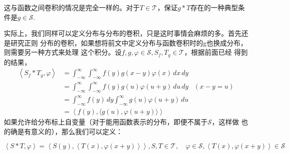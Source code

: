 这与函数之间卷积的情况是完全一样的。对于$T\in\mathcal{T}$，保证$g*T$存在的一种典型条件是$g\in\mathcal{S}$.

实际上，我们同样可以定义分布与分布的卷积，只是这时事情会麻烦的多。首先还是研究正则
分布的卷积，如果想将前文中定义分布与函数卷积时的g也换成分布，则需要另一种方式来处理
这个积分。设$f,g,\varphi\in\mathcal{S} ,S_f,T_g\in\mathcal{T} $，根据前面已经
得到的结果，
\begin{align*}
    \left\langle S_f *T_g,\varphi\right\rangle & =\int_{-\infty}^{\infty}\int_{-\infty}^{\infty}f(y)g(x-y)\varphi(x)\,dx\,dy           \\
                                    & =\int_{-\infty}^{\infty}\int_{-\infty}^{\infty}f(y)g(u)\varphi(u+y)\,du\,dy & (x-y=u) \\
                                    & =\int_{-\infty}^{\infty}f(y)\,dy\int_{-\infty}^{\infty}g(u)\varphi(u+y)\,du           \\
                                    & =\left\langle f(y),\langle g(u),\varphi(u+y)\rangle\right\rangle
\end{align*}
如果允许给分布标上自变量（对于能用函数表示的分布，即便不属于$\mathcal{S} $，这样做
也的确是有意义的），那么我们可以定义\cite{brad_osgood_ee261}：
\begin{definition}[分布与分布的卷积]\label{def:conv_distr_distr}
    \begin{equation*}
    \left\langle S*T,\varphi\right\rangle=\left\langle S(y),\left\langle T(x),\varphi(x+y)\right\rangle\right\rangle,S,T\in\mathcal{T} ,\quad\varphi\in\mathcal{S} ,\left\langle T(x),\varphi(x+y)\right\rangle\in\mathcal{S}
\end{equation*}
\end{definition}

